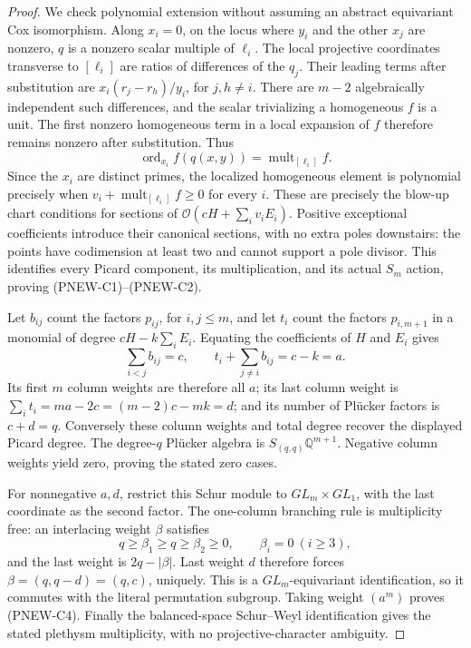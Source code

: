 \begin{proof}
We check polynomial extension without assuming an abstract
equivariant Cox isomorphism.  Along $x_i=0$, on the locus
where $y_i$ and the other $x_j$ are nonzero, $q$ is a
nonzero scalar multiple of $\ell_i$.  The local projective
coordinates transverse to $[\ell_i]$ are ratios of differences
of the $q_j$.  Their leading terms after substitution are
$x_i(r_j-r_h)/y_i$, for $j,h\ne i$.  There are $m-2$
algebraically independent such differences, and the scalar
trivializing a homogeneous $f$ is a unit.  The first nonzero
homogeneous term in a local expansion of $f$ therefore
remains nonzero after substitution.  Thus
\[
 \operatorname{ord}_{x_i}f(q(x,y))
                =\operatorname{mult}_{[\ell_i]}f.
 \tag{PNEW-C7}
\]
Since the $x_i$ are distinct primes, the localized homogeneous
element is polynomial precisely when
$v_i+\operatorname{mult}_{[\ell_i]}f\ge0$ for every $i$.
These are precisely the blow-up chart conditions for sections
of $\mathcal O(cH+\sum_i v_iE_i)$.  Positive exceptional
coefficients introduce their canonical sections, with no
extra poles downstairs: the points have codimension at
least two and cannot support a pole divisor.  This
identifies every Picard component, its multiplication, and
its actual $S_m$ action, proving (PNEW-C1)--(PNEW-C2).

Let $b_{ij}$ count the factors $p_{ij}$, for $i,j\le m$,
and let $t_i$ count the factors $p_{i,m+1}$ in a monomial
of degree $cH-k\sum_iE_i$.  Equating the coefficients
of $H$ and $E_i$ gives
\[
 \sum_{i<j}b_{ij}=c,
 \qquad t_i+\sum_{j\ne i}b_{ij}=c-k=a.
 \tag{PNEW-C8}
\]
Its first $m$ column weights are therefore all $a$; its
last column weight is
$\sum_i t_i=ma-2c=(m-2)c-mk=d$; and its number of
Pl\"ucker factors is $c+d=q$.
Conversely these column weights and total degree recover
the displayed Picard degree.  The degree-$q$ Pl\"ucker
algebra is $S_{(q,q)}\mathbb Q^{m+1}$.  Negative column
weights yield zero, proving the stated zero cases.

For nonnegative $a,d$, restrict this Schur module to
$GL_m\times GL_1$, with the last coordinate as the second
factor.  The one-column branching rule is multiplicity
free: an interlacing weight $\beta$ satisfies
\[
 q\ge\beta_1\ge q\ge\beta_2\ge0,
 \qquad\beta_i=0\ (i\ge3),
\]
and the last weight is $2q-|\beta|$.  Last weight $d$
therefore forces $\beta=(q,q-d)=(q,c)$, uniquely.
This is a $GL_m$-equivariant identification, so it commutes
with the literal permutation subgroup.  Taking weight
$(a^m)$ proves (PNEW-C4).  Finally the balanced-space
Schur--Weyl identification gives the stated plethysm
multiplicity, with no projective-character ambiguity.
\end{proof}

